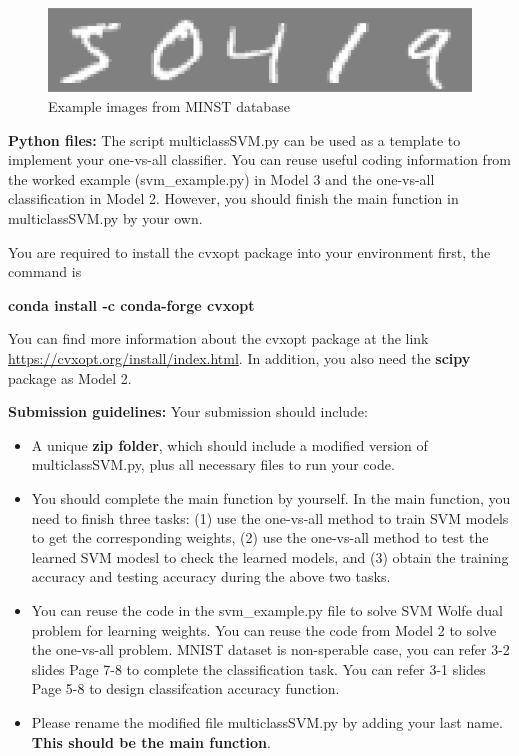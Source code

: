 \documentclass[11pt,oneside,a4paper]{article}
\begin{document}
\begin{enumerate}
  \begin{figure}\centering
  			\includegraphics[height=0.12\textwidth]{digits.eps}
  			\caption{Example images from MINST database}
  			\label{fig:MINSTimages}
   \end{figure}
  
  
  \textbf{Python files:} The script multiclassSVM.py can be used as a template to implement your one-vs-all classifier. 
  You can reuse useful coding information from the worked example (svm\_example.py) in Model 3 and the one-vs-all classification in Model 2.
  However, you should finish the main function in multiclassSVM.py by your own.
  
  You are required to install the cvxopt package into your environment first, the command is 
  
  \centerline{ \textbf{conda install -c conda-forge cvxopt}}
  You can find more information about the cvxopt package at the link \url{https://cvxopt.org/install/index.html}.
  In addition, you also need the \textbf{scipy} package as Model 2.
  
  
  \textbf{Submission guidelines:} Your submission should include:
  \begin{itemize}
  	\item A unique \textbf{zip folder}, which should include a modified version of multiclassSVM.py, plus all necessary files to run your code. 
	\item You should complete the main function by yourself. In the main function, you need to finish three tasks: (1) use the one-vs-all method to train SVM models to get the corresponding weights, (2) use the one-vs-all method to test the learned SVM modesl to check the learned models, and (3) obtain the training accuracy and testing accuracy during the above two tasks.
	\item You can reuse the code in the svm\_example.py file to solve SVM Wolfe dual problem for learning weights.
	You can reuse the code from Model 2 to solve the one-vs-all problem.
MNIST dataset is non-sperable case, you can refer 3-2 slides Page 7-8 to complete the classification task.
You can refer 3-1 slides Page 5-8 to design classifcation accuracy function.

  	\item Please rename the modified file multiclassSVM.py by adding your last name. \textbf{This should be the main function}.
  	

\end{itemize}
\end{enumerate}
\end{document}
